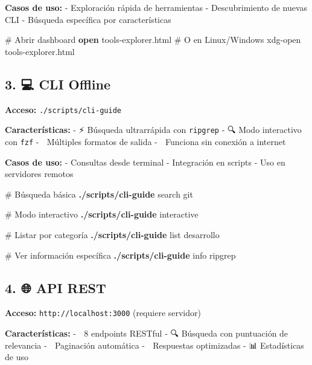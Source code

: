 \documentclass[
  11pt,
  letterpaper,
  oneside,
  openany]{scrbook}
\newenvironment{Shaded}{}{}
\newcommand{\CommentTok}[1]{\textcolor[rgb]{0.42,0.45,0.49}{#1}}
\newcommand{\ExtensionTok}[1]{\textcolor[rgb]{0.84,0.23,0.29}{\textbf{#1}}}
\newcommand{\FunctionTok}[1]{\textcolor[rgb]{0.44,0.26,0.76}{#1}}
\newcommand{\NormalTok}[1]{\textcolor[rgb]{0.14,0.16,0.18}{#1}}
\begin{document}
\textbf{Casos de uso:} - Exploración rápida de herramientas -
Descubrimiento de nuevas CLI - Búsqueda específica por características

\begin{Shaded}
\begin{Highlighting}[]
\CommentTok{\# Abrir dashboard}
\ExtensionTok{open}\NormalTok{ tools{-}explorer.html}
\CommentTok{\# O en Linux/Windows}
\FunctionTok{xdg{-}open}\NormalTok{ tools{-}explorer.html}
\end{Highlighting}
\end{Shaded}

\subsection{3. 💻 CLI Offline}\label{cli-offline-1}

\textbf{Acceso:} \texttt{./scripts/cli-guide}

\textbf{Características:} - ⚡ Búsqueda ultrarrápida con
\texttt{ripgrep} - 🔍 Modo interactivo con \texttt{fzf} - 📄 Múltiples
formatos de salida - 🚀 Funciona sin conexión a internet

\textbf{Casos de uso:} - Consultas desde terminal - Integración en
scripts - Uso en servidores remotos

\begin{Shaded}
\begin{Highlighting}[]
\CommentTok{\# Búsqueda básica}
\ExtensionTok{./scripts/cli{-}guide}\NormalTok{ search git}

\CommentTok{\# Modo interactivo}
\ExtensionTok{./scripts/cli{-}guide}\NormalTok{ interactive}

\CommentTok{\# Listar por categoría}
\ExtensionTok{./scripts/cli{-}guide}\NormalTok{ list desarrollo}

\CommentTok{\# Ver información específica}
\ExtensionTok{./scripts/cli{-}guide}\NormalTok{ info ripgrep}
\end{Highlighting}
\end{Shaded}

\subsection{4. 🌐 API REST}\label{api-rest}

\textbf{Acceso:} \texttt{http://localhost:3000} (requiere servidor)

\textbf{Características:} - 🔗 8 endpoints RESTful - 🔍 Búsqueda con
puntuación de relevancia - 📄 Paginación automática - 🚀 Respuestas
optimizadas - 📊 Estadísticas de uso
\end{document}
